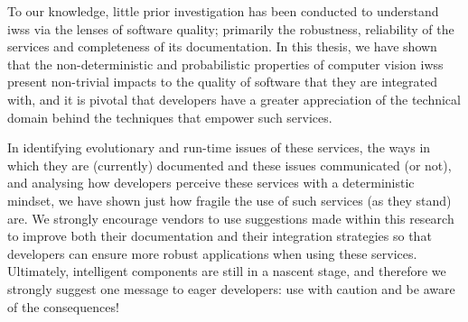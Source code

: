 To our knowledge, little prior investigation has been conducted to understand \glspl{iws} via the lenses of software quality; primarily the robustness, reliability of the services and completeness of its documentation. In this thesis, we have shown that the non-deterministic and probabilistic properties of computer vision \glspl{iws} present non-trivial impacts to the quality of software that they are integrated with, and it is pivotal that developers have a greater appreciation of the technical domain behind the  techniques that empower such services. 

In identifying evolutionary and run-time issues of these services, the ways in which they are (currently) documented and these issues communicated (or not), and analysing how developers perceive these services with a deterministic mindset, we have shown just how fragile the use of such services (as they stand) are. We strongly encourage vendors to use suggestions made within this research to improve both their documentation and their integration strategies so that developers can ensure more robust applications when using these services. Ultimately, intelligent  components are still in a nascent stage, and therefore we strongly suggest one message to eager developers: use with caution and be aware of the consequences!
